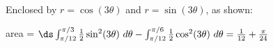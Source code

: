 {Enclosed by $r=\cos(3 \theta)$ and $r=\sin(3\theta)$, as shown:

}
{area = $\ds \int_{\pi/12}^{\pi/3} \frac12 \sin^2(3\theta)\ d\theta - \int_{\pi/12}^{\pi/6}\frac12\cos^2(3\theta)\ d\theta = \frac1{12}+\frac{\pi}{24}$}
